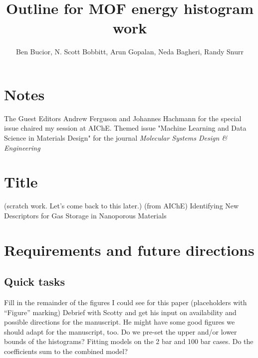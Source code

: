 \documentclass[letterpaper]{article}
\title{Outline for MOF energy histogram work}
\author{Ben Bucior, N. Scott Bobbitt, Arun Gopalan, Neda Bagheri, Randy Snurr}
\begin{document}
\maketitle

%

\section{Notes}
\begin{outline}
	\1 The Guest Editors Andrew Ferguson and Johannes Hachmann for the special issue chaired my session at AIChE.
	\1 Themed issue "Machine Learning and Data Science in Materials Design" for the journal \textit{Molecular Systems Design \& Engineering}
\end{outline}


\section{Title}
\begin{outline}
	\1 (scratch work.  Let's come back to this later.)
	\1 (from AIChE) Identifying New Descriptors for Gas Storage in Nanoporous Materials
\end{outline}

\section{Requirements and future directions}

\subsection{Quick tasks}
\begin{outline}
	\1 Fill in the remainder of the figures I could see for this paper (placeholders with ``Figure'' marking)
	\1 Debrief with Scotty and get his input on availability and possible directions for the manuscript.  He might have some good figures we should adapt for the manuscript, too.
	\1 Do we pre-set the upper and/or lower bounds of the histograms?
	\1 Fitting models on the 2 bar and 100 bar cases.  Do the coefficients sum to the combined model?
\end{outline}
\end{document}

